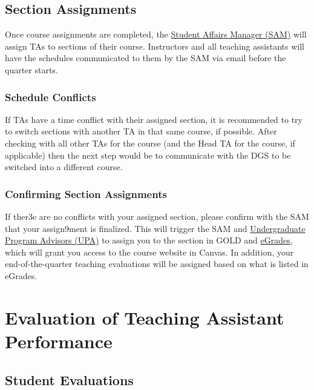 \documentclass[
  letterpaper,
  DIV=11,
  numbers=noendperiod]{scrreprt}
\begin{document}
\hypertarget{section-assignments}{%
\chapter{Section Assignments}\label{section-assignments}}

Once course assignments are completed, the
\protect\hyperlink{Staff}{Student Affairs Manager (SAM)} will assign TAs
to sections of their course. Instructors and all teaching assistants
will have the schedules communicated to them by the SAM via email before
the quarter starts.

\hypertarget{schedule-conflicts}{%
\section{Schedule Conflicts}\label{schedule-conflicts}}

If TAs have a time conflict with their assigned section, it is
recommended to try to switch sections with another TA in that same
course, if possible. After checking with all other TAs for the course
(and the Head TA for the course, if applicable) then the next step would
be to communicate with the DGS to be switched into a different course.

\hypertarget{confirming-section-assignments}{%
\section{Confirming Section
Assignments}\label{confirming-section-assignments}}

If ther3e are no conflicts with your assigned section, please confirm
with the SAM that your assign9ment is finalized. This will trigger the
SAM and \protect\hyperlink{Staff}{Undergraduate Program Advisors (UPA)}
to assign you to the section in GOLD and
\href{http://egrades.sa.ucsb.edu}{eGrades}, which will grant you access
to the course website in Canvas. In addition, your end-of-the-quarter
teaching evaluations will be assigned based on what is listed in
eGrades.

\part{\textbf{Evaluation of Teaching Assistant Performance}}

\hypertarget{student-evaluations}{%
\chapter{Student Evaluations}\label{student-evaluations}}
\end{document}
